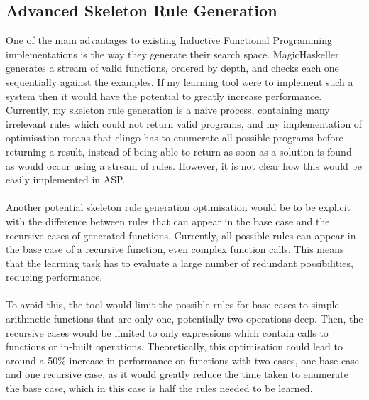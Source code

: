 \subsection{Advanced Skeleton Rule Generation}
One of the main advantages to existing Inductive Functional Programming implementations is the way they generate their search space. MagicHaskeller generates a stream of valid functions, ordered by depth, and checks each one sequentially against the examples. If my learning tool were to implement such a system then it would have the potential to greatly increase performance. Currently, my skeleton rule generation is a naive process, containing many irrelevant rules which could not return valid programs, and my implementation of optimisation means that clingo has to enumerate all possible programs before returning a result, instead of being able to return as soon as a solution is found as would occur using a stream of rules. However, it is not clear how this would be easily implemented in ASP. \\ \\
Another potential skeleton rule generation optimisation would be to be explicit with the difference between rules that can appear in the base case and the recursive cases of generated functions. Currently, all possible rules can appear in the base case of a recursive function, even complex function calls. This means that the learning task has to evaluate a large number of redundant possibilities, reducing performance. \\ \\
To avoid this, the tool would limit the possible rules for base cases to simple arithmetic functions that are only one, potentially two operations deep. Then, the recursive cases would be limited to only expressions which contain calls to functions or in-built operations. Theoretically, this optimisation could lead to around a 50\% increase in performance on functions with two cases, one base case and one recursive case, as it would greatly reduce the time taken to enumerate the base case, which in this case is half the rules needed to be learned.

